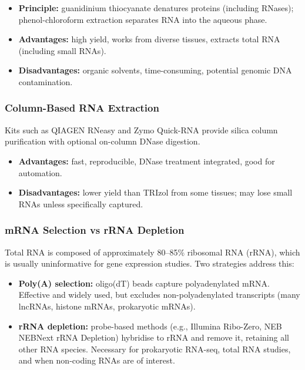\begin{itemize}[nosep]
  \item \textbf{Principle:} guanidinium thiocyanate denatures proteins (including RNases); phenol-chloroform extraction separates RNA into the aqueous phase.
  \item \textbf{Advantages:} high yield, works from diverse tissues, extracts total RNA (including small RNAs).
  \item \textbf{Disadvantages:} organic solvents, time-consuming, potential genomic DNA contamination.
\end{itemize}

\subsubsection{Column-Based RNA Extraction}

Kits such as QIAGEN RNeasy and Zymo Quick-RNA provide silica column purification with optional on-column DNase digestion.

\begin{itemize}[nosep]
  \item \textbf{Advantages:} fast, reproducible, DNase treatment integrated, good for automation.
  \item \textbf{Disadvantages:} lower yield than TRIzol from some tissues; may lose small RNAs unless specifically captured.
\end{itemize}

\subsubsection{mRNA Selection vs rRNA Depletion}

Total RNA is composed of approximately 80--85\% ribosomal RNA (rRNA), which is usually uninformative for gene expression studies. Two strategies address this:

\begin{itemize}
  \item \textbf{Poly(A) selection:} oligo(dT) beads capture polyadenylated mRNA. Effective and widely used, but excludes non-polyadenylated transcripts (many lncRNAs, histone mRNAs, prokaryotic mRNAs).
  \item \textbf{rRNA depletion:} probe-based methods (e.g., Illumina Ribo-Zero, NEB NEBNext rRNA Depletion) hybridise to rRNA and remove it, retaining all other RNA species. Necessary for prokaryotic \gls{RNA-seq}, total RNA studies, and when non-coding RNAs are of interest.
\end{itemize}

